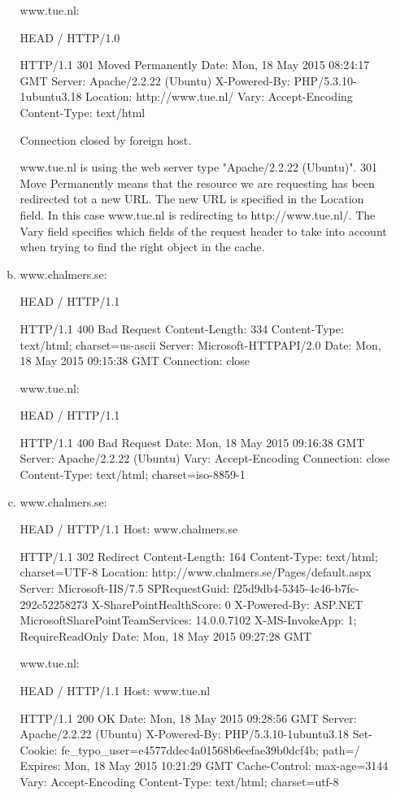 \documentclass[a4paper,9pt,fleqn]{article}
\begin{document}
\begin{enumerate}[{Task} 1]
\begin{enumerate}[a)]
	www.tue.nl:

	HEAD / HTTP/1.0

	HTTP/1.1 301 Moved Permanently
	Date: Mon, 18 May 2015 08:24:17 GMT
	Server: Apache/2.2.22 (Ubuntu)
	X-Powered-By: PHP/5.3.10-1ubuntu3.18
	Location: http://www.tue.nl/
	Vary: Accept-Encoding
	Content-Type: text/html


	Connection closed by foreign host.


	www.tue.nl is using the web server type "Apache/2.2.22 (Ubuntu)".
	301 Move Permanently means that the resource we are requesting has been redirected tot a new URL. The new URL is specified in the Location field. In this case www.tue.nl is redirecting to http://www.tue.nl/.
	The Vary field specifies which fields of the request header to take into account when trying to find the right object in the cache.
\item 
www.chalmers.se:

	HEAD / HTTP/1.1

	HTTP/1.1 400 Bad Request
	Content-Length: 334
	Content-Type: text/html; charset=us-ascii
	Server: Microsoft-HTTPAPI/2.0
	Date: Mon, 18 May 2015 09:15:38 GMT
	Connection: close

	www.tue.nl:

	HEAD / HTTP/1.1

	HTTP/1.1 400 Bad Request
	Date: Mon, 18 May 2015 09:16:38 GMT
	Server: Apache/2.2.22 (Ubuntu)
	Vary: Accept-Encoding
	Connection: close
	Content-Type: text/html; charset=iso-8859-1
\item 
www.chalmers.se:

	HEAD / HTTP/1.1
	Host: www.chalmers.se

	HTTP/1.1 302 Redirect
	Content-Length: 164
	Content-Type: text/html; charset=UTF-8
	Location: http://www.chalmers.se/Pages/default.aspx
	Server: Microsoft-IIS/7.5
	SPRequestGuid: f25d9db4-5345-4c46-b7fc-292c52258273
	X-SharePointHealthScore: 0
	X-Powered-By: ASP.NET
	MicrosoftSharePointTeamServices: 14.0.0.7102
	X-MS-InvokeApp: 1; RequireReadOnly
	Date: Mon, 18 May 2015 09:27:28 GMT

	www.tue.nl:

	HEAD / HTTP/1.1
	Host: www.tue.nl

	HTTP/1.1 200 OK
	Date: Mon, 18 May 2015 09:28:56 GMT
	Server: Apache/2.2.22 (Ubuntu)
	X-Powered-By: PHP/5.3.10-1ubuntu3.18
	Set-Cookie: fe_typo_user=e4577ddec4a01568b6eefae39b0dcf4b; path=/
	Expires: Mon, 18 May 2015 10:21:29 GMT
	Cache-Control: max-age=3144
	Vary: Accept-Encoding
	Content-Type: text/html; charset=utf-8


\end{enumerate}
\end{enumerate}
\end{document}

